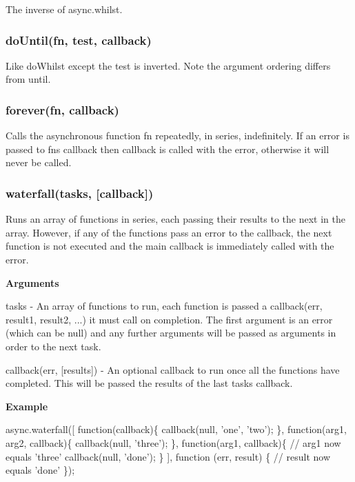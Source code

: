 The inverse of async.\+whilst. 



\label{_doUntil}%
 \subsubsection*{do\+Until(fn, test, callback)}

Like do\+Whilst except the test is inverted. Note the argument ordering differs from {\ttfamily until}. 



\label{_forever}%
 \subsubsection*{forever(fn, callback)}

Calls the asynchronous function \textquotesingle{}fn\textquotesingle{} repeatedly, in series, indefinitely. If an error is passed to fn\textquotesingle{}s callback then \textquotesingle{}callback\textquotesingle{} is called with the error, otherwise it will never be called. 



\label{_waterfall}%
 \subsubsection*{waterfall(tasks, \mbox{[}callback\mbox{]})}

Runs an array of functions in series, each passing their results to the next in the array. However, if any of the functions pass an error to the callback, the next function is not executed and the main callback is immediately called with the error.

{\bfseries Arguments}


\begin{DoxyItemize}
\item tasks -\/ An array of functions to run, each function is passed a callback(err, result1, result2, ...) it must call on completion. The first argument is an error (which can be null) and any further arguments will be passed as arguments in order to the next task.
\item callback(err, \mbox{[}results\mbox{]}) -\/ An optional callback to run once all the functions have completed. This will be passed the results of the last task\textquotesingle{}s callback.
\end{DoxyItemize}

{\bfseries Example}


\begin{DoxyCode}
async.waterfall([
    function(callback)\{
        callback(null, 'one', 'two');
    \},
    function(arg1, arg2, callback)\{
        callback(null, 'three');
    \},
    function(arg1, callback)\{
        // arg1 now equals 'three'
        callback(null, 'done');
    \}
], function (err, result) \{
   // result now equals 'done'    
\});
\end{DoxyCode}
 

